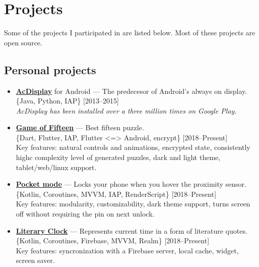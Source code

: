 \documentclass[a4paper]{article}
\begin{document}
	\section*{Projects}
	Some of the projects I participated in are listed below. Most of these projects are open source.
	\subsection*{Personal projects}
	\begin{itemize}
		\item \faAndroid \href{http://artemchep.com/acdisplay/}{\textbf{AcDisplay}} for Android --- The predecesor of Android's always on display. \\[0.2em]
		{\footnotesize \{Java, Python, IAP\} \hfill [2013--2015]} \\[0.2em]
		\textit{AcDisplay has been installed over a three million times on Google Play.} 

		\item \faAndroid \faChrome \faLinux \href{https://github.com/AChep/15puzzle}{\textbf{Game of Fifteen}} --- Best fifteen puzzle. \\[0.2em]
		{\footnotesize \{Dart, Flutter, IAP, Flutter <=> Android, encrypt\} \hfill [2018--Present]} \\[0.2em]
		Key features: natural controls and animations, encrypted state, consistently highc complexity level of generated puzzles, dark and light theme, tablet/web/linux support. 
		
		\item \faAndroid \href{https://github.com/AChep/PocketMode}{\textbf{Pocket mode}} --- Locks your phone when you hover the proximity sensor. \\[0.2em]
		{\footnotesize \{Kotlin, Coroutines, MVVM, IAP, RenderScript\} \hfill [2018--Present]} \\[0.2em]
		Key features: modularity, customizability, dark theme support, turns screen off without requiring the pin on next unlock.   
		
		\item \faAndroid \href{https://github.com/AChep/literaryclock}{\textbf{Literary Clock}} --- Represents current time in a form of literature quotes. \\[0.2em]
		{\footnotesize \{Kotlin, Coroutines, Firebase, MVVM, Realm\} \hfill [2018--Present]} \\[0.2em]
		Key features: syncronization with a Firebase server, local cache, widget, screen saver.  
			

\end{itemize}
\end{document}
